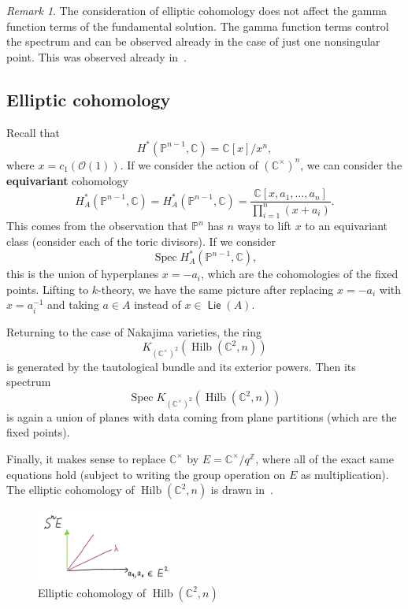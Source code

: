 \documentclass[leqno, openany]{memoir}
\theoremstyle{definition}
\theoremstyle{remark}
\newtheorem{rmk}[thm]{Remark}
\theoremstyle{plain}
\theoremstyle{definition}
\theoremstyle{remark}
\newcommand{\C}{\mathbb{C}}
\newcommand{\Z}{\mathbb{Z}}
\renewcommand{\P}{\mathbb{P}}
\newcommand{\mc}[1]{\mathcal{#1}}
\newcommand{\ms}[1]{\mathsf{#1}}
\newcommand{\on}[1]{\operatorname{#1}}
\DeclareMathOperator{\Spec}{Spec}
\DeclareMathOperator{\Hilb}{Hilb}
\begin{document}
\begin{rmk}
    The consideration of elliptic cohomology does not affect the gamma function terms of the fundamental solution. The gamma function terms control the spectrum and can be observed already in the case of just one nonsingular point. This was observed already in~\cite{nekshat}.
\end{rmk}

\subsection{Elliptic cohomology}

Recall that
\[ H^*(\P^{n-1}, \C) = \C[x]/x^{n}, \]
where $x = c_1(\mc{O}(1))$. If we consider the action of $(\C^{\times})^n$, we can consider the \textbf{equivariant} cohomology 
\[ H_A^*(\P^{n-1}, \C) = H_A^*(\P^{n-1}, \C) = \frac{\C[x, a_1, \ldots, a_n]}{\prod_{i=1}^n (x+a_i)}. \]
This comes from the observation that $\P^n$ has $n$ ways to lift $x$ to an equivariant class (consider each of the toric divisors). If we consider
\[ \Spec H_A^*(\P^{n-1}, \C), \]
this is the union of hyperplanes $x = -a_i$, which are the cohomologies of the fixed points. Lifting to $k$-theory, we have the same picture after replacing $x=-a_i$ with $x=a_i^{-1}$ and taking $a \in A$ instead of $x \in \on{\ms{Lie}}(A)$.

Returning to the case of Nakajima varieties, the ring 
\[ K_{(\C^{\times})^2} (\Hilb(\C^2, n)) \]
is generated by the tautological bundle and its exterior powers. Then its spectrum
\[ \Spec K_{(\C^{\times})^2}(\Hilb(\C^2, n)) \]
is again a union of planes with data coming from plane partitions (which are the fixed points).

Finally, it makes sense to replace $\C^{\times}$ by $E = \C^{\times}/q^{\Z}$, where all of the exact same equations hold (subject to writing the group operation on $E$ as multiplication). The elliptic cohomology of $\Hilb(\C^2, n)$ is drawn in~.
\begin{figure}[h]
    \centering
    \includegraphics[width=0.4\textwidth]{ellhilbc2}
    \caption{Elliptic cohomology of $\Hilb(\C^2, n)$}
    \label{fig:ellhilbc2}
\end{figure}
\end{document}

